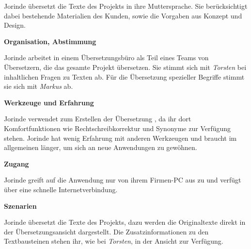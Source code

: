 \begin{multicols}{2}

\begin{center}
\end{center}


Jorinde übersetzt die Texte des Projekts in ihre Muttersprache. Sie berücksichtigt dabei bestehende Materialien des Kunden, sowie die Vorgaben aus Konzept und Design.

\textbf{Organisation, Abstimmung}

Jorinde arbeitet in einem Übersetzungsbüro als Teil eines Teams von Übersetzern, die das gesamte Projekt übersetzen. Sie stimmt sich mit \emph{Torsten} bei inhaltlichen Fragen zu Texten ab. Für die Übersetzung spezieller Begriffe stimmt sie sich mit \emph{Markus} ab.

\textbf{Werkzeuge und Erfahrung}

Jorinde verwendet zum Erstellen der Übersetzung , da ihr dort Komfortfunktionen wie Rechtschreibkorrektur und Synonyme zur Verfügung stehen.  Jorinde hat wenig Erfahrung mit anderen Werkzeugen und braucht im allgemeinen länger, um sich an neue Anwendungen zu gewöhnen.

\textbf{Zugang}

Jorinde greift auf die Anwendung nur von ihrem Firmen-PC aus zu und verfügt über eine schnelle Internetverbindung.

\columnbreak

\textbf{Szenarien}

Jorinde übersetzt die Texte des Projekts, dazu werden die Originaltexte direkt in der Übersetzungsansicht dargestellt. Die Zusatzinformationen zu den Textbausteinen stehen ihr, wie bei \emph{Torsten}, in der Ansicht zur Verfügung.


\end{multicols}
